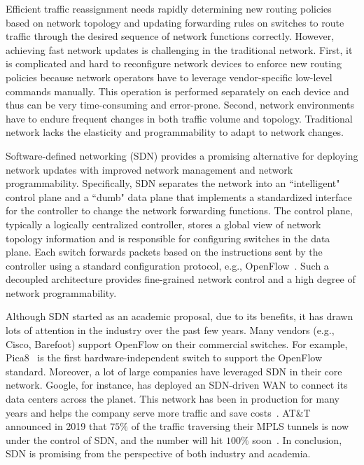 Efficient traffic reassignment needs rapidly determining new routing policies based on network topology and updating forwarding rules on switches to route traffic through the desired sequence of network functions correctly. 
However, achieving fast network updates is challenging in the traditional network. First, it is complicated and hard to reconfigure network devices to enforce new routing policies because network operators have to leverage vendor-specific low-level commands manually. This operation is performed separately on each device and thus can be very time-consuming and error-prone. Second, network environments have to endure frequent changes in both traffic volume and topology. Traditional network lacks the elasticity and programmability to adapt to network changes.

Software-defined networking (SDN) provides a promising alternative for deploying network updates with improved network management and network programmability. Specifically, SDN separates the network into an ``intelligent" control plane and a ``dumb" data plane that implements a standardized interface for the controller to change the network forwarding functions. The control plane, typically a logically centralized controller, stores a global view of network topology information and is responsible for configuring switches in the data plane. Each switch forwards packets based on the instructions sent by the controller using a standard configuration protocol, e.g., OpenFlow~\cite{OpenFlowSpec}. Such a decoupled architecture provides fine-grained network control and a high degree of network programmability. 

Although SDN started as an academic proposal, due to its benefits, it has drawn lots of attention in the industry over the past few years. Many vendors (e.g., Cisco, Barefoot) support OpenFlow on their commercial switches. For example, Pica8~\cite{pica8} is the first hardware-independent switch to support the OpenFlow standard. Moreover, a lot of large companies have leveraged SDN in their core network. Google, for instance, has deployed an SDN-driven WAN to connect its data centers across the planet. This network has been in production for many years and helps the company serve more traffic and save costs~\cite{b4}. AT\&T announced in 2019 that $75\%$ of the traffic traversing their MPLS tunnels is now under the control of SDN, and the number will hit $100\%$ soon~\cite{att}. In conclusion, SDN is promising from the perspective of both industry and academia.


